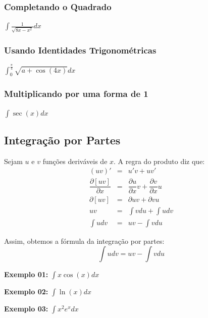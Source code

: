 \documentclass[oneside,a4paper,12pt]{article}
\begin{document}
\vspace{400pt}

\subsubsection{Completando o Quadrado}
$\int \frac{1}{\sqrt{8x-x^2}}dx$

\vspace{400pt}

\subsubsection{Usando Identidades Trigonométricas}
$\int_{0}^{\frac{\pi}{4}}\sqrt{a + \cos(4x)}dx$

\vspace{350pt}

\subsubsection{Multiplicando por uma forma de 1}
$\int \sec(x)dx$

\vspace{400pt}

\subsection{Integração por Partes}

Sejam $u$ e $v$ funções deriváveis de $x$. A regra do produto diz que:
\begin{eqnarray*}
(uv)' & = & u'v + uv' \\
\dfrac{\partial [uv]}{\partial x} & = & \dfrac{\partial u}{\partial x}v + \dfrac{\partial v}{\partial x}u \\
\partial[uv] & = & \partial u v + \partial v u \\
uv & = & \int v du + \int u dv \\
\int u dv & = & uv - \int v du
\end{eqnarray*}

Assim, obtemos a fórmula da integração por partes:
$$\int u dv = uv - \int v du$$

{\bf Exemplo 01:} $\int x \cos(x) dx$

\vspace{250pt}

{\bf Exemplo 02:} $\int \ln(x) dx$

\vspace{250pt}

{\bf Exemplo 03:} $\int x^2 e^x dx$
\end{document}

